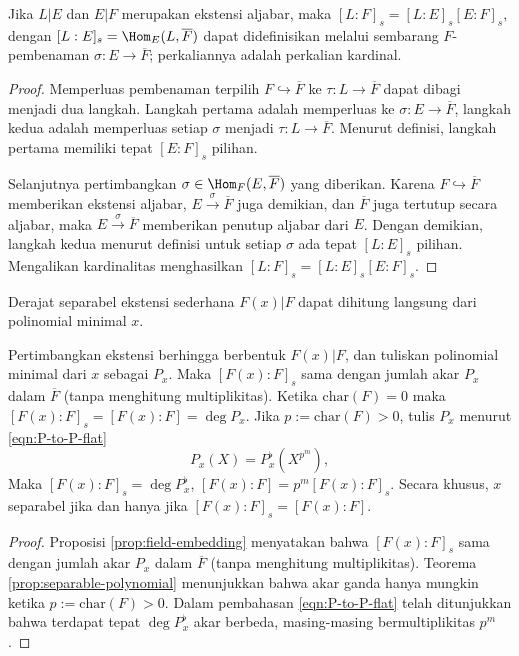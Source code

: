 \begin{proposition}\label{prop:field-tower-sdegree}
	Jika $L|E$ dan $E|F$ merupakan ekstensi aljabar, maka $[L:F]_s = [L:E]_s [E:F]_s$, dengan $[L:E]_s = \Hom_E(L, \overline{F})$ dapat didefinisikan melalui sembarang $F$-pembenaman $\sigma: E \to \overline{F}$; perkaliannya adalah perkalian kardinal.
\end{proposition}
\begin{proof}
	Memperluas pembenaman terpilih $F \hookrightarrow \overline{F}$ ke $\tau: L \to \overline{F}$ dapat dibagi menjadi dua langkah. Langkah pertama adalah memperluas ke $\sigma: E \to \overline{F}$, langkah kedua adalah memperluas setiap $\sigma$ menjadi $\tau: L \to \overline{F}$. Menurut definisi, langkah pertama memiliki tepat $[E:F]_s$ pilihan.

	Selanjutnya pertimbangkan $\sigma \in \Hom_F(E, \overline{F})$ yang diberikan. Karena $F \hookrightarrow \overline{F}$ memberikan ekstensi aljabar, $E \xrightarrow{\sigma} \overline{F}$ juga demikian, dan $\overline{F}$ juga tertutup secara aljabar, maka $E \xrightarrow{\sigma} \overline{F}$ memberikan penutup aljabar dari $E$. Dengan demikian, langkah kedua menurut definisi untuk setiap $\sigma$ ada tepat $[L:E]_s$ pilihan. Mengalikan kardinalitas menghasilkan $[L:F]_s = [L:E]_s [E:F]_s$.
\end{proof}

Derajat separabel ekstensi sederhana $F(x)|F$ dapat dihitung langsung dari polinomial minimal $x$.
\begin{lemma}\label{prop:field-sdegree-F(x)}
	Pertimbangkan ekstensi berhingga berbentuk $F(x)|F$, dan tuliskan polinomial minimal dari $x$ sebagai $P_x$. Maka $[F(x):F]_s$ sama dengan jumlah akar $P_x$ dalam $\overline{F}$ (tanpa menghitung multiplikitas). Ketika $\mathrm{char}(F)=0$ maka $[F(x):F]_s = [F(x):F] = \deg P_x$. Jika $p := \mathrm{char}(F) > 0$, tulis $P_x$ menurut \eqref{eqn:P-to-P-flat}
	\[ P_x(X) = P^\flat_x\left( X^{p^m} \right), \]
	Maka $[F(x):F]_s = \deg P^\flat_x$, $[F(x):F] = p^m [F(x):F]_s$. Secara khusus, $x$ separabel jika dan hanya jika $[F(x):F]_s = [F(x):F]$.
\end{lemma}
\begin{proof}
	Proposisi \ref{prop:field-embedding} menyatakan bahwa $[F(x):F]_s$ sama dengan jumlah akar $P_x$ dalam $\overline{F}$ (tanpa menghitung multiplikitas). Teorema \ref{prop:separable-polynomial} menunjukkan bahwa akar ganda hanya mungkin ketika $p := \mathrm{char}(F) > 0$. Dalam pembahasan \eqref{eqn:P-to-P-flat} telah ditunjukkan bahwa terdapat tepat $\deg P^\flat_x$ akar berbeda, masing-masing bermultiplikitas $p^m$.
\end{proof}

